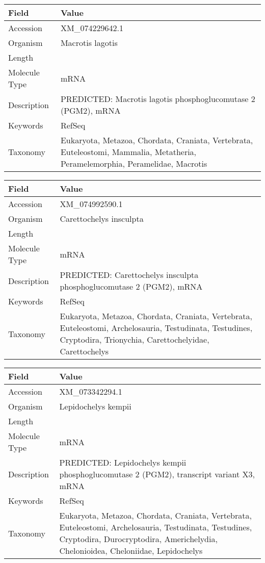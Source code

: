 \documentclass[10pt]{article}
\begin{document}
{\footnotesize
\begin{longtable}{>{\raggedright\arraybackslash}p{4.5cm} >{\raggedright\arraybackslash}p{11.5cm}}
\textbf{Field} & \textbf{Value} \\
\hline
Accession & XM\_074229642.1 \\
Organism & Macrotis lagotis \\
Length & 3649 \\
Molecule Type & mRNA \\
Description & PREDICTED: Macrotis lagotis phosphoglucomutase 2 (PGM2), mRNA \\
Keywords & RefSeq \\
Taxonomy & Eukaryota, Metazoa, Chordata, Craniata, Vertebrata, Euteleostomi, Mammalia, Metatheria, Peramelemorphia, Peramelidae, Macrotis \\
\end{longtable}
}

{\footnotesize
\begin{longtable}{>{\raggedright\arraybackslash}p{4.5cm} >{\raggedright\arraybackslash}p{11.5cm}}
\textbf{Field} & \textbf{Value} \\
\hline
Accession & XM\_074992590.1 \\
Organism & Carettochelys insculpta \\
Length & 12252 \\
Molecule Type & mRNA \\
Description & PREDICTED: Carettochelys insculpta phosphoglucomutase 2 (PGM2), mRNA \\
Keywords & RefSeq \\
Taxonomy & Eukaryota, Metazoa, Chordata, Craniata, Vertebrata, Euteleostomi, Archelosauria, Testudinata, Testudines, Cryptodira, Trionychia, Carettochelyidae, Carettochelys \\
\end{longtable}
}

{\footnotesize
\begin{longtable}{>{\raggedright\arraybackslash}p{4.5cm} >{\raggedright\arraybackslash}p{11.5cm}}
\textbf{Field} & \textbf{Value} \\
\hline
Accession & XM\_073342294.1 \\
Organism & Lepidochelys kempii \\
Length & 4197 \\
Molecule Type & mRNA \\
Description & PREDICTED: Lepidochelys kempii phosphoglucomutase 2 (PGM2), transcript variant X3, mRNA \\
Keywords & RefSeq \\
Taxonomy & Eukaryota, Metazoa, Chordata, Craniata, Vertebrata, Euteleostomi, Archelosauria, Testudinata, Testudines, Cryptodira, Durocryptodira, Americhelydia, Chelonioidea, Cheloniidae, Lepidochelys \\
\end{longtable}
}
\end{document}

